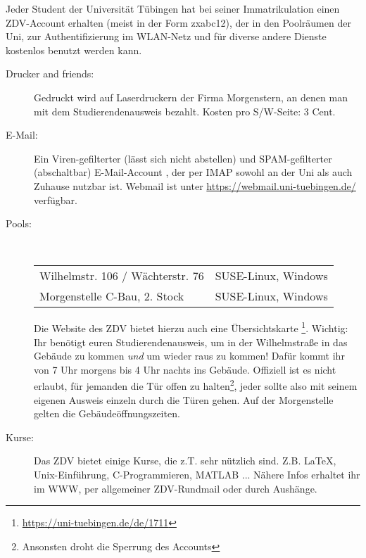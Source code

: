 Jeder Student der Universität Tübingen hat bei seiner Immatrikulation einen ZDV-Account erhalten (meist in der Form zxabc12), der in den Poolräumen der Uni, zur Authentifizierung im WLAN-Netz und für diverse andere Dienste kostenlos benutzt werden kann. 

\begin{description}

  \item[Drucker and friends:]
    Gedruckt wird auf Laserdruckern der Firma Morgenstern, an denen man mit dem Studierendenausweis bezahlt. Kosten pro S/W-Seite:
    3 Cent.

  \item[E-Mail:]
    Ein Viren-gefilterter (lässt sich nicht abstellen) und SPAM-gefilterter
    (abschaltbar) E-Mail-Account ,
    der per IMAP sowohl an der Uni als auch Zuhause nutzbar ist. Webmail ist unter \url{https://webmail.uni-tuebingen.de/} verfügbar. 

  \item[Pools:] ~\\
    \begin{tabular}{ll}
      Wilhelmstr. 106 / Wächterstr. 76 &                SUSE-Linux, Windows \\
      Morgenstelle C-Bau, 2. Stock &            SUSE-Linux, Windows \\
    \end{tabular}

    Die Website des ZDV bietet hierzu auch eine Übersichtskarte
    \footnote{\url{https://uni-tuebingen.de/de/1711}}.	%
    Wichtig: Ihr benötigt euren Studierendenausweis, um in der Wilhelmstraße in das Gebäude zu kommen \emph{und} um wieder raus zu kommen! Dafür kommt ihr von 7 Uhr morgens bis 4 Uhr nachts ins Gebäude. Offiziell ist es nicht erlaubt, für jemanden die Tür offen zu halten\footnote{Ansonsten droht die Sperrung des Accounts}, jeder sollte also mit seinem eigenen Ausweis einzeln durch die Türen gehen. Auf der Morgenstelle gelten die Gebäudeöffnungszeiten.

  \item[Kurse:]
    Das ZDV bietet einige Kurse, die z.T. sehr nützlich sind. Z.B. \LaTeX,
    Unix-Ein\-führ\-ung, C-Programmieren, MATLAB ... Nähere Infos erhaltet ihr im
    WWW, per allgemeiner ZDV-Rundmail oder durch Aushänge.


\end{description}
